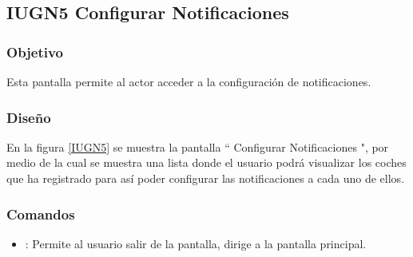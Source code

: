 \subsection{IUGN5 Configurar Notificaciones}

\subsubsection{Objetivo}

	
    Esta pantalla permite al actor acceder a la configuración de notificaciones.

\subsubsection{Diseño}


    En la figura \ref{IUGN5} se muestra la pantalla `` Configurar Notificaciones ", por medio de la cual se muestra una lista donde el usuario podrá visualizar los coches que ha registrado para así poder configurar las notificaciones a cada uno de ellos.\\

\subsubsection{Comandos}
    \begin{itemize}
    	\item \btnRegresar[Regresar]: Permite al usuario salir de la pantalla, dirige a la pantalla principal.
    \end{itemize}

